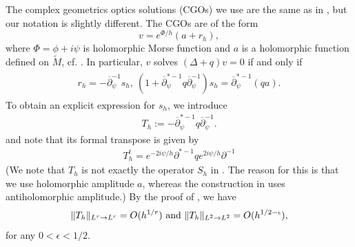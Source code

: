\documentclass[12pt]{amsart}
\def\p{\partial}
\DeclarePairedDelimiter\norm{\lVert}{\rVert}
\theoremstyle{definition}
\theoremstyle{remark}
\newcommand{\tbl}[1]{\textcolor{blue}{#1}}
\newcommand{\eps}{\epsilon}
\newcommand{\f}[1]{\footnote{\tbl{#1}}}
\newcommand{\s}{\hspace{0.5pt}}
\newcommand{\op}{\overline \p}
\begin{document}
The complex geometrics optics solutions (CGOs) we use are the same as in \cite{guillarmou2011identification}, but our notation is slightly different. The CGOs are of the form 
\[
 v=e^{\Phi/h}(a+r_h),
\]
where $\Phi=\phi+i\psi$ is holomorphic Morse function and $a$ is a holomorphic function defined on $\widetilde M$, cf. \cite[Proposition 3.1, Eq. 21]{guillarmou2011identification}. %
In particular, $v$ solves $(\Delta + q)v=0$ if and only if
\begin{align}\label{eq:equation_for_rh}
\begin{split}
r_h=-\overline{\p}_\psi^{-1}s_h,\  (1+\op_\psi^{*-1}q\overline\p_\psi^{-1})s_h=\op_\psi^{*-1}(qa).
 \end{split}
\end{align}
To obtain an explicit expression for $s_h$, we introduce
\begin{eqnarray}\label{def: Th}
 T_h:=-\op_\psi^{*-1}q\overline\p_\psi^{-1}.
\end{eqnarray}
and note that its formal transpose is given by 
\begin{eqnarray}
\label{adjoint of T}
T_h^t = e^{-2i\psi/h} \p^{*-1} qe^{2i\psi/h} \p^{-1}
\end{eqnarray}
(We note that $T_h$ is not exactly the operator $S_h$ in \cite{guillarmou2011identification}. The reason for this is that we use holomorphic amplitude $a$, whereas the construction in \cite{guillarmou2011identification} uses antiholomorphic amplitude.)
By the proof of \cite[Lemma 3.1]{guillarmou2011identification}, we have
\[
 \norm{T_h}_{L^r\to L^r}=O(h^{1/r}) \text{ and } \norm{T_h}_{L^2\to L^2}=O(h^{1/2-\eps}), 
\]
for any $0<\eps<1/2$.
\end{document}
